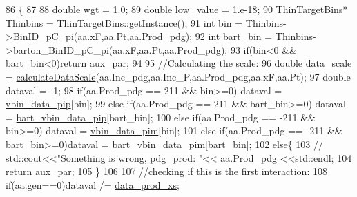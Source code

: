 \begin{DoxyCode}
86                                                                              \{
87     
88     \textcolor{keywordtype}{double} wgt = 1.0;
89     \textcolor{keywordtype}{double} low\_value = 1.e-18; 
90     ThinTargetBins*  Thinbins =  \hyperlink{class_neutrino_flux_reweight_1_1_thin_target_bins_aeff5cf7220dd08322f5abac2cbc7ff33}{ThinTargetBins::getInstance}();
91     \textcolor{keywordtype}{int} bin = Thinbins->BinID\_pC\_pi(aa.xF,aa.Pt,aa.Prod\_pdg);
92     \textcolor{keywordtype}{int} bart\_bin = Thinbins->barton\_BinID\_pC\_pi(aa.xF,aa.Pt,aa.Prod\_pdg);
93     \textcolor{keywordflow}{if}(bin<0 && bart\_bin<0)\textcolor{keywordflow}{return} \hyperlink{class_neutrino_flux_reweight_1_1_thin_targetp_c_pion_reweighter_a87d4a2cfb3ce6e4e5c7f0f3be1144915}{aux\_par};
94     
95     \textcolor{comment}{//Calculating the scale:}
96     \textcolor{keywordtype}{double} data\_scale = \hyperlink{class_neutrino_flux_reweight_1_1_thin_targetp_c_pion_reweighter_ac34d175572ca9ac093e973e877891eae}{calculateDataScale}(aa.Inc\_pdg,aa.Inc\_P,aa.Prod\_pdg,aa.xF,aa.Pt);
97     \textcolor{keywordtype}{double} dataval = -1;
98     \textcolor{keywordflow}{if}(aa.Prod\_pdg == 211 && bin>=0)           dataval = \hyperlink{class_neutrino_flux_reweight_1_1_thin_targetp_c_pion_reweighter_a3602ae8237c0cc7729045b13b90874b4}{vbin\_data\_pip}[bin];
99     \textcolor{keywordflow}{else} \textcolor{keywordflow}{if}(aa.Prod\_pdg == 211 && bart\_bin>=0) dataval = \hyperlink{class_neutrino_flux_reweight_1_1_thin_targetp_c_pion_reweighter_a844e9c7ba521a42ce5ebe5fbb5b2d5f4}{bart\_vbin\_data\_pip}[bart\_bin];
100     \textcolor{keywordflow}{else} \textcolor{keywordflow}{if}(aa.Prod\_pdg == -211 && bin>=0)     dataval = \hyperlink{class_neutrino_flux_reweight_1_1_thin_targetp_c_pion_reweighter_aea0dca1b93e560e26871da0bdf1ac075}{vbin\_data\_pim}[bin];
101     \textcolor{keywordflow}{else} \textcolor{keywordflow}{if}(aa.Prod\_pdg == -211 && bart\_bin>=0)dataval = \hyperlink{class_neutrino_flux_reweight_1_1_thin_targetp_c_pion_reweighter_a9d7ffcf3ca0c5a7b0f1c37435cc86403}{bart\_vbin\_data\_pim}[bart\_bin];
102     \textcolor{keywordflow}{else}\{
103       \textcolor{comment}{//  std::cout<<"Something is wrong, pdg\_prod: "<< aa.Prod\_pdg  <<std::endl;}
104       \textcolor{keywordflow}{return} \hyperlink{class_neutrino_flux_reweight_1_1_thin_targetp_c_pion_reweighter_a87d4a2cfb3ce6e4e5c7f0f3be1144915}{aux\_par};
105     \}
106 
107     \textcolor{comment}{//checking if this is the first interaction:}
108     \textcolor{keywordflow}{if}(aa.gen==0)dataval /= \hyperlink{class_neutrino_flux_reweight_1_1_thin_targetp_c_pion_reweighter_ae2c5b20aa1823516579b0684d188d75d}{data\_prod\_xs};

\end{DoxyCode}
